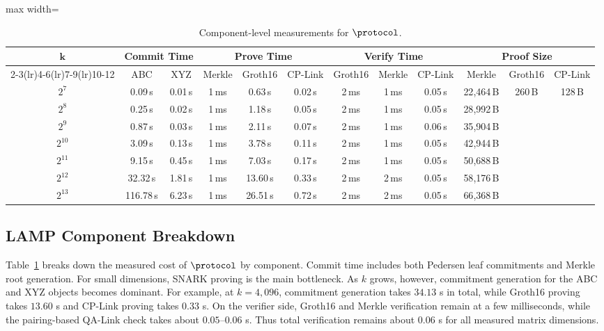 \begin{table}[!t]
\centering
\setlength{\tabcolsep}{3.5pt}
\begin{adjustbox}{max width=\textwidth}
\begin{tabular}{c cc ccc ccc ccc}
\toprule
\multirow{2}{*}{\(\boldsymbol{k}\)}
& \multicolumn{2}{c}{\textbf{Commit Time}}
& \multicolumn{3}{c}{\textbf{Prove Time}}
& \multicolumn{3}{c}{\textbf{Verify Time}}
& \multicolumn{3}{c}{\textbf{Proof Size}} \\
\cmidrule(lr){2-3}\cmidrule(lr){4-6}\cmidrule(lr){7-9}\cmidrule(lr){10-12}
& ABC & XYZ
& Merkle & Groth16 & CP-Link
& Groth16 & Merkle & CP-Link
& Merkle & Groth16 & CP-Link \\
\midrule
$2^7$    & 0.09\,s    & 0.01\,s & 1\,ms & 0.63\,s  & 0.02\,s & 2\,ms & 1\,ms & 0.05\,s & 22{,}464\,B & \multirow{7}{*}{260\,B} & \multirow{7}{*}{128\,B} \\
$2^8$    & 0.25\,s    & 0.02\,s & 1\,ms & 1.18\,s  & 0.05\,s & 2\,ms & 1\,ms & 0.05\,s & 28{,}992\,B & & \\
$2^9$    & 0.87\,s    & 0.03\,s & 1\,ms & 2.11\,s  & 0.07\,s & 2\,ms & 1\,ms & 0.06\,s & 35{,}904\,B & & \\
$2^{10}$ & 3.09\,s    & 0.13\,s & 1\,ms & 3.78\,s  & 0.11\,s & 2\,ms & 1\,ms & 0.05\,s & 42{,}944\,B & & \\
$2^{11}$ & 9.15\,s    & 0.45\,s & 1\,ms & 7.03\,s  & 0.17\,s & 2\,ms & 1\,ms & 0.05\,s & 50{,}688\,B & & \\
$2^{12}$ & 32.32\,s   & 1.81\,s & 1\,ms & 13.60\,s & 0.33\,s & 2\,ms & 2\,ms & 0.05\,s & 58{,}176\,B & & \\
$2^{13}$ & 116.78\,s  & 6.23\,s & 1\,ms & 26.51\,s & 0.72\,s & 2\,ms & 2\,ms & 0.05\,s & 66{,}368\,B & & \\
\bottomrule
\end{tabular}
\end{adjustbox}
\vspace{6pt}
\caption{Component-level measurements for \(\protocol\).}
\label{tab:lamp-breakdown}
\end{table}

\subsection{LAMP Component Breakdown}
\label{sec:eval-lamp-breakdown}

Table~\ref{tab:lamp-breakdown} breaks down the measured cost of \(\protocol\)
by component.  Commit time includes both Pedersen leaf commitments and Merkle
root generation.  For small dimensions, SNARK proving is the main bottleneck.
As \(k\) grows, however, commitment generation for the ABC and XYZ objects
becomes dominant.  For example, at \(k=4{,}096\), commitment generation takes
\(34.13\) s in total, while Groth16 proving takes \(13.60\) s and CP-Link
proving takes \(0.33\) s.  On the verifier side, Groth16 and Merkle
verification remain at a few milliseconds, while the pairing-based QA-Link
check takes about \(0.05\)--\(0.06\) s.  Thus total verification remains about \(0.06\) s for all measured matrix dimensions.



